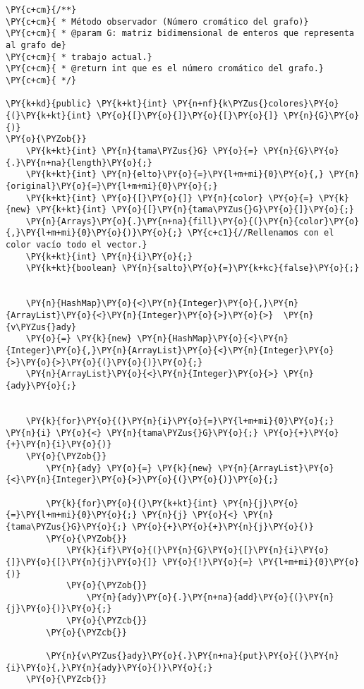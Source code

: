\begin{Verbatim}[commandchars=\\\{\}]
\PY{c+cm}{/**}
\PY{c+cm}{ * Método observador (Número cromático del grafo)}
\PY{c+cm}{ * @param G: matriz bidimensional de enteros que representa al grafo de}
\PY{c+cm}{ * trabajo actual.}
\PY{c+cm}{ * @return int que es el número cromático del grafo.}
\PY{c+cm}{ */}

\PY{k+kd}{public} \PY{k+kt}{int} \PY{n+nf}{k\PYZus{}colores}\PY{o}{(}\PY{k+kt}{int} \PY{o}{[}\PY{o}{]}\PY{o}{[}\PY{o}{]} \PY{n}{G}\PY{o}{)}
\PY{o}{\PYZob{}}
    \PY{k+kt}{int} \PY{n}{tama\PYZus{}G} \PY{o}{=} \PY{n}{G}\PY{o}{.}\PY{n+na}{length}\PY{o}{;}
    \PY{k+kt}{int} \PY{n}{elto}\PY{o}{=}\PY{l+m+mi}{0}\PY{o}{,} \PY{n}{original}\PY{o}{=}\PY{l+m+mi}{0}\PY{o}{;}
    \PY{k+kt}{int} \PY{o}{[}\PY{o}{]} \PY{n}{color} \PY{o}{=} \PY{k}{new} \PY{k+kt}{int} \PY{o}{[}\PY{n}{tama\PYZus{}G}\PY{o}{]}\PY{o}{;}
    \PY{n}{Arrays}\PY{o}{.}\PY{n+na}{fill}\PY{o}{(}\PY{n}{color}\PY{o}{,}\PY{l+m+mi}{0}\PY{o}{)}\PY{o}{;} \PY{c+c1}{//Rellenamos con el color vacío todo el vector.}
    \PY{k+kt}{int} \PY{n}{i}\PY{o}{;}
    \PY{k+kt}{boolean} \PY{n}{salto}\PY{o}{=}\PY{k+kc}{false}\PY{o}{;}


    \PY{n}{HashMap}\PY{o}{<}\PY{n}{Integer}\PY{o}{,}\PY{n}{ArrayList}\PY{o}{<}\PY{n}{Integer}\PY{o}{>}\PY{o}{>}  \PY{n}{v\PYZus{}ady} 
	\PY{o}{=} \PY{k}{new} \PY{n}{HashMap}\PY{o}{<}\PY{n}{Integer}\PY{o}{,}\PY{n}{ArrayList}\PY{o}{<}\PY{n}{Integer}\PY{o}{>}\PY{o}{>}\PY{o}{(}\PY{o}{)}\PY{o}{;}
    \PY{n}{ArrayList}\PY{o}{<}\PY{n}{Integer}\PY{o}{>} \PY{n}{ady}\PY{o}{;}


    \PY{k}{for}\PY{o}{(}\PY{n}{i}\PY{o}{=}\PY{l+m+mi}{0}\PY{o}{;} \PY{n}{i} \PY{o}{<} \PY{n}{tama\PYZus{}G}\PY{o}{;} \PY{o}{+}\PY{o}{+}\PY{n}{i}\PY{o}{)}
	\PY{o}{\PYZob{}}
	    \PY{n}{ady} \PY{o}{=} \PY{k}{new} \PY{n}{ArrayList}\PY{o}{<}\PY{n}{Integer}\PY{o}{>}\PY{o}{(}\PY{o}{)}\PY{o}{;}

	    \PY{k}{for}\PY{o}{(}\PY{k+kt}{int} \PY{n}{j}\PY{o}{=}\PY{l+m+mi}{0}\PY{o}{;} \PY{n}{j} \PY{o}{<} \PY{n}{tama\PYZus{}G}\PY{o}{;} \PY{o}{+}\PY{o}{+}\PY{n}{j}\PY{o}{)}
		\PY{o}{\PYZob{}}
		    \PY{k}{if}\PY{o}{(}\PY{n}{G}\PY{o}{[}\PY{n}{i}\PY{o}{]}\PY{o}{[}\PY{n}{j}\PY{o}{]} \PY{o}{!}\PY{o}{=} \PY{l+m+mi}{0}\PY{o}{)}
			\PY{o}{\PYZob{}}
			    \PY{n}{ady}\PY{o}{.}\PY{n+na}{add}\PY{o}{(}\PY{n}{j}\PY{o}{)}\PY{o}{;}
			\PY{o}{\PYZcb{}}
		\PY{o}{\PYZcb{}}

	    \PY{n}{v\PYZus{}ady}\PY{o}{.}\PY{n+na}{put}\PY{o}{(}\PY{n}{i}\PY{o}{,}\PY{n}{ady}\PY{o}{)}\PY{o}{;}
	\PY{o}{\PYZcb{}}


\end{Verbatim}
